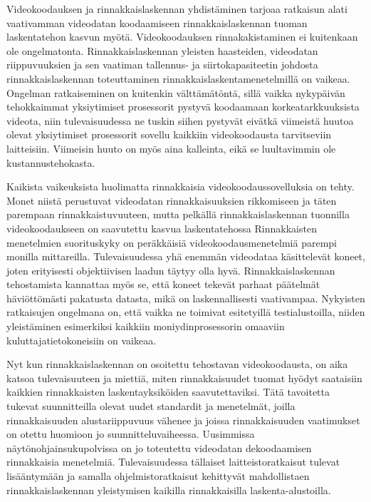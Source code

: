 Videokoodauksen ja rinnakkaislaskennan yhdistäminen tarjoaa ratkaisun alati
vaativamman videodatan koodaamiseen rinnakkaislaskennan tuoman laskentatehon
kasvun myötä. Videokoodauksen rinnakakistaminen ei kuitenkaan ole ongelmatonta.
Rinnakkaislaskennan yleisten haasteiden, videodatan riippuvuuksien ja sen
vaatiman tallennus- ja siirtokapasiteetin johdosta rinnakkaislaskennan
toteuttaminen rinnakkaislaskentamenetelmillä on vaikeaa. Ongelman ratkaiseminen
on kuitenkin välttämätöntä, sillä vaikka nykypäivän tehokkaimmat yksiytimiset
prosessorit pystyvä koodaamaan korkeatarkkuuksista videota, niin tulevaisuudessa
ne tuskin siihen pystyvät eivätkä viimeistä huutoa olevat yksiytimiset
prosessorit sovellu kaikkiin videokoodausta tarvitseviin laitteisiin. Viimeisin
huuto on myös aina kalleinta, eikä se luultavimmin ole kustannustehokasta.

Kaikista vaikeuksista huolimatta rinnakkaisia videokoodaussovelluksia on tehty.
Monet niistä perustuvat videodatan rinnakkaisuuksien rikkomiseen ja täten
parempaan rinnakkaistuvuuteen, mutta pelkällä rinnakkaislaskennan tuonnilla
videokoodaukseen on saavutettu kasvua laskentatehossa Rinnakkaisten
menetelmien suorituskyky on peräkkäisiä videokoodausmenetelmiä parempi monilla
mittareilla. Tulevaisuudessa yhä enemmän videodataa käsittelevät koneet, joten
erityisesti objektiivisen laadun täytyy olla hyvä. Rinnakkaislaskennan
tehostamista kannattaa myös se, että koneet tekevät parhaat päätelmät
häviöttömästi pakatusta datasta, mikä on laskennallisesti vaativampaa.
Nykyisten ratkaisujen ongelmana on, että vaikka ne toimivat esitetyillä
testialustoilla, niiden yleistäminen esimerkiksi kaikkiin moniydinprosessorin
omaaviin kuluttajatietokoneisiin on vaikeaa.

Nyt kun rinnakkaislaskennan on osoitettu tehostavan videokoodausta, on aika
katsoa tulevaisuuteen ja miettiä, miten rinnakkaisuudet tuomat hyödyt
saataisiin kaikkien rinnakkaisten laskentayksiköiden saavutettaviksi. Tätä
tavoitetta tukevat suunnitteilla olevat uudet standardit ja menetelmät, joilla
rinnakkaisuuden alustariippuvuus vähenee ja joissa rinnakkaisuuden vaatimukset
on otettu huomioon jo suunnitteluvaiheessa. Uusimmissa näytönohjainsukupolvissa
on jo toteutettu videodatan dekoodaamisen rinnakkaisia menetelmiä.
Tulevaisuudessa tällaiset laitteistoratkaisut tulevat lisääntymään ja samalla
ohjelmistoratkaisut kehittyvät mahdollistaen rinnakkaislaskennan yleistymisen
kaikilla rinnakkaisilla laskenta-alustoilla.



